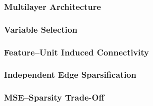 \documentclass{article}
\begin{document}
%
%
%


\subsubsection{Multilayer Architecture}
\label{sec:mlp_architecture}

%
%
%
%
%
%
%
%


\subsubsection{Variable Selection}
\label{sec:mlp_feature}

%
%


\subsubsection{Feature--Unit Induced Connectivity}
\label{sec:mlp_induced}

%
%
%
%


\subsubsection{Independent Edge Sparsification}
\label{sec:mlp_edge}

%
%
%


\subsubsection{MSE--Sparsity Trade-Off}
\label{sec:mse_sparsity}
\end{document}
